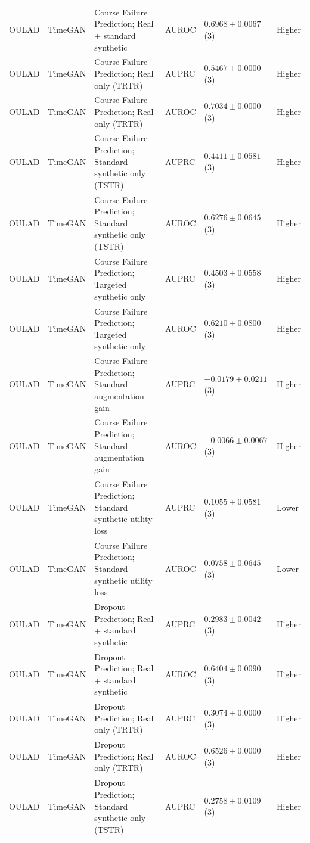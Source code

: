 \begin{longtable}{@{}p{2.25cm}p{2.05cm}p{4.7cm}p{5.0cm}p{2.6cm}p{1.25cm}@{}}
OULAD & TimeGAN & Course Failure Prediction; Real + standard synthetic & AUROC & $0.6968 \mathbin{\pm} 0.0067$ (3) & Higher \\
OULAD & TimeGAN & Course Failure Prediction; Real only (TRTR) & AUPRC & $0.5467 \mathbin{\pm} 0.0000$ (3) & Higher \\
OULAD & TimeGAN & Course Failure Prediction; Real only (TRTR) & AUROC & $0.7034 \mathbin{\pm} 0.0000$ (3) & Higher \\
OULAD & TimeGAN & Course Failure Prediction; Standard synthetic only (TSTR) & AUPRC & $0.4411 \mathbin{\pm} 0.0581$ (3) & Higher \\
OULAD & TimeGAN & Course Failure Prediction; Standard synthetic only (TSTR) & AUROC & $0.6276 \mathbin{\pm} 0.0645$ (3) & Higher \\
OULAD & TimeGAN & Course Failure Prediction; Targeted synthetic only & AUPRC & $0.4503 \mathbin{\pm} 0.0558$ (3) & Higher \\
OULAD & TimeGAN & Course Failure Prediction; Targeted synthetic only & AUROC & $0.6210 \mathbin{\pm} 0.0800$ (3) & Higher \\
OULAD & TimeGAN & Course Failure Prediction; Standard augmentation gain & AUPRC & $-0.0179 \mathbin{\pm} 0.0211$ (3) & Higher \\
OULAD & TimeGAN & Course Failure Prediction; Standard augmentation gain & AUROC & $-0.0066 \mathbin{\pm} 0.0067$ (3) & Higher \\
OULAD & TimeGAN & Course Failure Prediction; Standard synthetic utility loss & AUPRC & $0.1055 \mathbin{\pm} 0.0581$ (3) & Lower \\
OULAD & TimeGAN & Course Failure Prediction; Standard synthetic utility loss & AUROC & $0.0758 \mathbin{\pm} 0.0645$ (3) & Lower \\
OULAD & TimeGAN & Dropout Prediction; Real + standard synthetic & AUPRC & $0.2983 \mathbin{\pm} 0.0042$ (3) & Higher \\
OULAD & TimeGAN & Dropout Prediction; Real + standard synthetic & AUROC & $0.6404 \mathbin{\pm} 0.0090$ (3) & Higher \\
OULAD & TimeGAN & Dropout Prediction; Real only (TRTR) & AUPRC & $0.3074 \mathbin{\pm} 0.0000$ (3) & Higher \\
OULAD & TimeGAN & Dropout Prediction; Real only (TRTR) & AUROC & $0.6526 \mathbin{\pm} 0.0000$ (3) & Higher \\
OULAD & TimeGAN & Dropout Prediction; Standard synthetic only (TSTR) & AUPRC & $0.2758 \mathbin{\pm} 0.0109$ (3) & Higher \\

\end{longtable}
